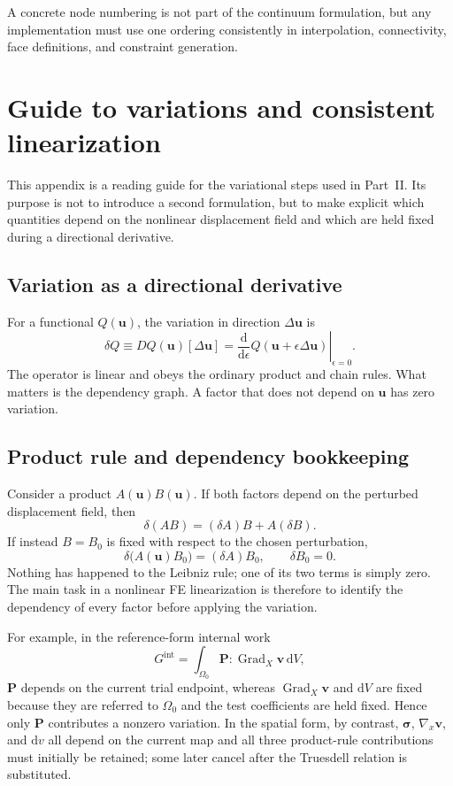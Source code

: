 \documentclass[11pt,a4paper]{article}
\newcommand{\bs}[1]{\boldsymbol{#1}}
\newcommand{\dd}{\mathrm{d}}
\newcommand{\Grad}{\operatorname{Grad}}
\begin{document}
A concrete node numbering is not part of the continuum formulation, but any implementation must use one ordering consistently in interpolation, connectivity, face definitions, and constraint generation.

\section{Guide to variations and consistent linearization}
\label{app:variations}

This appendix is a reading guide for the variational steps used in Part~II. Its purpose is not to introduce a second formulation, but to make explicit which quantities depend on the nonlinear displacement field and which are held fixed during a directional derivative.

\subsection{Variation as a directional derivative}
For a functional $Q(\bs u)$, the variation in direction $\Delta\bs u$ is
\begin{equation}
\delta Q
\equiv
DQ(\bs u)[\Delta\bs u]
=
\left.\frac{\dd}{\dd\epsilon}
Q(\bs u+\epsilon\Delta\bs u)\right|_{\epsilon=0}.
\end{equation}
The operator is linear and obeys the ordinary product and chain rules. What matters is the dependency graph. A factor that does not depend on $\bs u$ has zero variation.

\subsection{Product rule and dependency bookkeeping}
Consider a product $A(\bs u)B(\bs u)$. If both factors depend on the perturbed displacement field, then
\begin{equation}
\delta(AB)=(\delta A)B+A(\delta B).
\end{equation}
If instead $B=B_0$ is fixed with respect to the chosen perturbation,
\begin{equation}
\delta\bigl(A(\bs u)B_0\bigr)=(\delta A)B_0,
\qquad
\delta B_0=0.
\end{equation}
Nothing has happened to the Leibniz rule; one of its two terms is simply zero. The main task in a nonlinear FE linearization is therefore to identify the dependency of every factor before applying the variation.

For example, in the reference-form internal work
\begin{equation}
G^{\mathrm{int}}=\int_{\Omega_0}\bs P:\Grad_X\bs v\,\dd V,
\end{equation}
$\bs P$ depends on the current trial endpoint, whereas $\Grad_X\bs v$ and $\dd V$ are fixed because they are referred to $\Omega_0$ and the test coefficients are held fixed. Hence only $\bs P$ contributes a nonzero variation. In the spatial form, by contrast, $\bs\sigma$, $\nabla_x\bs v$, and $\dd v$ all depend on the current map and all three product-rule contributions must initially be retained; some later cancel after the Truesdell relation is substituted.
\end{document}
